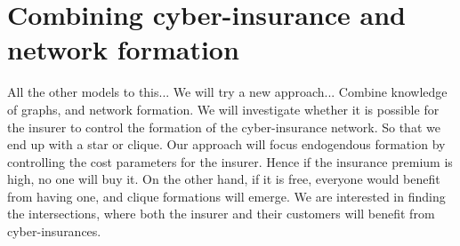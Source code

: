 \chapter{Combining cyber-insurance and network formation}

All the other models to this...
We will try a new approach...
Combine knowledge of graphs, and network formation. We will investigate whether it is possible for the insurer to control the formation of the cyber-insurance network. So that we end up with a star or clique. Our approach will focus endogendous formation by controlling the cost parameters for the insurer. Hence if the insurance premium is high, no one will buy it. On the other hand, if it is free, everyone would benefit from having one, and clique formations will emerge. We are interested in finding the intersections, where both the insurer and their customers will benefit from cyber-insurances. 